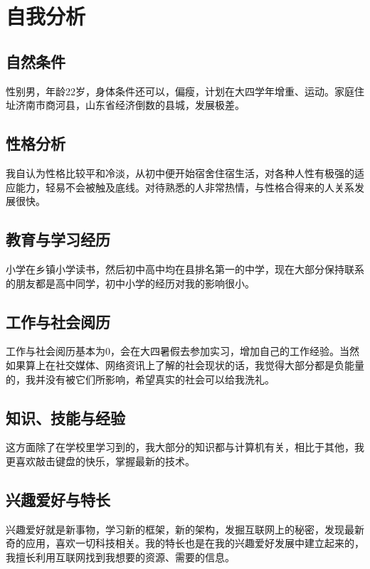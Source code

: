 \documentclass{article}
\begin{document}
\thispagestyle{empty}
\newpage
\setcounter{page}{1}
\section{自我分析}
\subsection{自然条件}
性别男，年龄22岁，身体条件还可以，偏瘦，计划在大四学年增重、运动。家庭住址济南市商河县，山东省经济倒数的县城，发展极差。
\subsection{性格分析}
我自认为性格比较平和冷淡，从初中便开始宿舍住宿生活，对各种人性有极强的适应能力，轻易不会被触及底线。对待熟悉的人非常热情，与性格合得来的人关系发展很快。
\subsection{教育与学习经历}
小学在乡镇小学读书，然后初中高中均在县排名第一的中学，现在大部分保持联系的朋友都是高中同学，初中小学的经历对我的影响很小。
\subsection{工作与社会阅历}
工作与社会阅历基本为0，会在大四暑假去参加实习，增加自己的工作经验。当然如果算上在社交媒体、网络资讯上了解的社会现状的话，我觉得大部分都是负能量的，我并没有被它们所影响，希望真实的社会可以给我洗礼。
\subsection{知识、技能与经验}
这方面除了在学校里学习到的，我大部分的知识都与计算机有关，相比于其他，我更喜欢敲击键盘的快乐，掌握最新的技术。
\subsection{兴趣爱好与特长}
兴趣爱好就是新事物，学习新的框架，新的架构，发掘互联网上的秘密，发现最新奇的应用，喜欢一切科技相关。我的特长也是在我的兴趣爱好发展中建立起来的，我擅长利用互联网找到我想要的资源、需要的信息。
\end{document}
